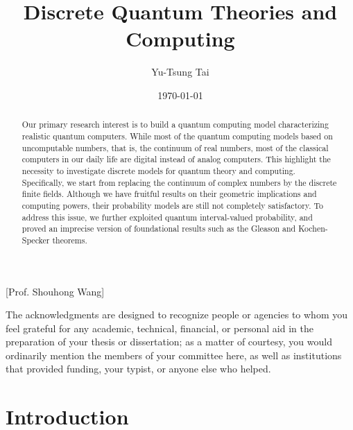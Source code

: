 \documentclass[twoside]{iuphd}
\begin{document}
\title{Discrete Quantum Theories and Computing}
\author{Yu-Tsung Tai}
\date{\today}

[Prof. Shouhong Wang]

\copyrightpage


\begin{acknowledgments}
The acknowledgments are designed to recognize people or agencies to whom you feel grateful for any academic,
technical, financial, or personal aid in the preparation of your thesis or dissertation; as a matter of
courtesy, you would ordinarily mention the members of your committee here, as well as institutions that
provided funding, your typist, or anyone else who helped.
\end{acknowledgments}


\begin{abstract}
Our primary research interest is to build a quantum computing model
characterizing realistic quantum computers. While most of the quantum
computing models based on uncomputable numbers, that is, the continuum
of real numbers, most of the classical computers in our daily life
are digital instead of analog computers. This highlight the necessity
to investigate discrete models for quantum theory and computing. Specifically,
we start from replacing the continuum of complex numbers by the discrete
finite fields. Although we have fruitful results on their geometric
implications and computing powers, their probability models are still
not completely satisfactory. To address this issue, we further exploited
quantum interval-valued probability, and proved an imprecise version
of foundational results such as the Gleason and Kochen-Specker theorems. 
\end{abstract}
\tableofcontents{}

\chapter{Introduction}
\end{document}
